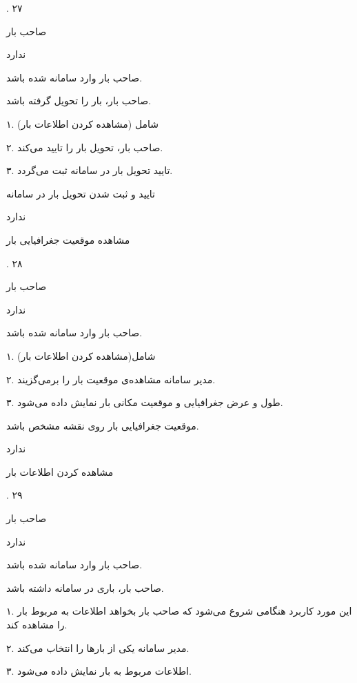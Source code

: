 .
۲۷

صاحب بار

ندارد


صاحب بار وارد سامانه شده باشد.

صاحب بار، بار را تحویل گرفته باشد.


۱. شامل (مشاهده کردن اطلاعات بار)

۲. صاحب بار، تحویل بار را تایید می‌کند.

۳. تایید تحویل بار در سامانه ثبت می‌گردد.

تایید و ثبت شدن تحویل بار در سامانه

ندارد

\newpage

مشاهده موقعیت جغرافیایی بار

.
۲۸

صاحب بار

ندارد

صاحب بار وارد سامانه شده باشد.


۱. شامل(مشاهده کردن اطلاعات بار)

۲. مدیر سامانه مشاهده‌ی موقعیت بار را برمی‌گزیند.

۳. طول و عرض جغرافیایی و موقعیت مکانی بار نمایش داده می‌شود.

موقعیت جغرافیایی بار روی نقشه مشخص باشد.

ندارد

\newpage

مشاهده کردن اطلاعات بار

.
۲۹

صاحب بار

ندارد

صاحب بار وارد سامانه شده باشد.

صاحب بار، باری در سامانه داشته باشد.


۱. این مورد کاربرد هنگامی شروع می‌شود که صاحب بار بخواهد اطلاعات به مربوط بار را مشاهده کند.

۲. مدیر سامانه یکی از بارها را انتخاب می‌کند.

۳. اطلاعات مربوط به بار نمایش داده می‌شود.

